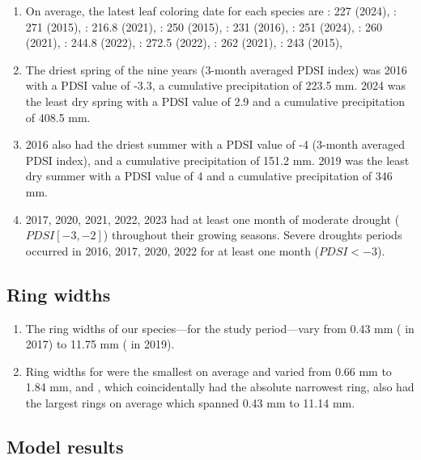 \documentclass{article}\usepackage[]{graphicx}\usepackage[]{xcolor}
\begin{document}
\begin{enumerate}
\item On average, the latest leaf coloring date for each species are
\Arub: 227 
(2024), 
\Asac: 271 
(2015), 
\Afla: 216.8 
(2021), 
\Ball: 250 
(2015), 
\Bnig: 231 
(2016), 
\Cgla: 251 
(2024), 
\Cova: 260 
(2021), 
\Pdel: 244.8 
(2022), 
\Qalb: 272.5 
(2022), 
\Qrub: 262 
(2021), 
\Tame: 243 
(2015), 

\item The driest spring of the nine years (3-month averaged PDSI index) was
2016 with a PDSI value of 
-3.3, a cumulative precipitation of 
223.5 mm.
2024 was the least dry spring with a PDSI value of 
2.9 and a cumulative precipitation of 408.5 mm.

\item 2016 also had the driest summer with a PDSI value of 
-4  (3-month averaged PDSI index), and a cumulative precipitation of 
151.2 mm.
2019 was the least dry summer with a PDSI value of 
4 and a cumulative precipitation of 
346 mm.

\item 2017, 2020, 2021, 2022, 2023 had at least one month of moderate drought ($PDSI [-3, -2]$) throughout their growing seasons.
Severe droughts periods occurred in 2016, 2017, 2020, 2022 for at least one month ($PDSI < -3$).

\end{enumerate}

\subsection{Ring widths}
\begin{enumerate}
\item The ring widths of our species---for the study period---vary from 
0.43 mm
({\Asac} in 
2017) to 
11.75 mm 
({\Tame} in 
2019). 
\item Ring widths for 
{\Cova} were the smallest on average and varied from 
0.66 mm to 
1.84 mm, and 
{\Asac}, which coincidentally had the absolute narrowest ring, also had the largest rings on average which spanned 
0.43 mm to
11.14 mm.
\end{enumerate}

\subsection{Model results}
\end{document}
